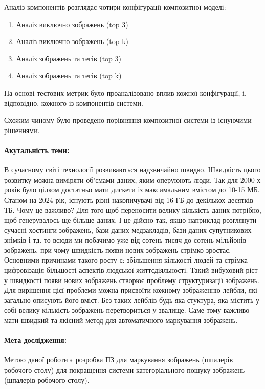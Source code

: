 \documentclass{udstu}
\begin{document}
Аналіз компонентів розглядає чотири конфігурації композитної моделі:
\begin{enumerate}[1)]
	\item Аналіз виключно зображень (top 3)
	\item Аналіз виключно зображень (top k)
	\item Аналіз зображень та тегів (top 3)
	\item Аналіз зображень та тегів (top k)
\end{enumerate}

На основі тестових метрик було проаналізовано вплив кожної конфігурації,
і, відповідно, кожного із компонентів системи.

Схожим чиному було проведено порівняння композитної системи із існуючими рішеннями.



\paragraph{\textbf{Акутальність теми:}}
В сучасному світі технології розвиваються надзвичайно швидко. Швидкість цього розвитку можна виміряти
об'ємами даних, яким оперуюють люди. Так для 2000-х років було цілком достатньо мати дискети із максимальним вмістом
до 10-15 МБ. Станом на 2024 рік, існують різні накопичувачі від 16 ГБ до декількох десятків ТБ. Чому це важливо?
Для того щоб переносити велику кількість даних потрібно, щоб генерувалось ще більше даних. І це дійсно так, якщо
наприклад розглянути сучасні хостинги зображень, бази даних медзакладів, бази даних супутникових знімків і тд.
то всюди ми побачимо уже від сотень тисяч до сотень мільйонів зображень,
при чому швидкість появи нових зображень стрімко зростає. Основними причинами такого росту є: збільшення кількості людей
та стрімка цифровізація більшості аспектів людської життєдіяльності. Такий вибуховий ріст у швидкості
появи нових зображень створює проблему структуризації зображень. Для вирішення цієї проблеми можна присвоїти
кожному зображенню лейбли, які загально описують його вміст.
Без таких лейблів будь яка стуктура, яка містить у собі велику кількість зображень перетвориться
у звалище. Саме тому важливо мати швидкий та якісний метод для автоматичного маркування зображень.

\paragraph{\textbf{Мета дослідження:}}
Метою даної роботи є розробка ПЗ для маркування зображень (шпалерів робочого столу)
для покращення системи категоріального пошуку зображень (шпалерів робочого столу).
\end{document}
